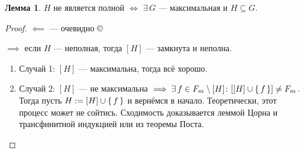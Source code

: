 \documentclass[12pt]{article}
\let\un\cup
\let\wot\setminus
\theoremstyle{definition}
\theoremstyle{statement}
\theoremstyle{theorem}
\newtheorem{lemma}{Лемма}[section]
\begin{document}
\begin{lemma}
  $H$ не является полной $\iff$ $\exists\, G$ --- максимальная и $H
  \subseteq G$.
  \begin{proof}
    $\impliedby$ --- очевидно \copyright

    $\implies$ если $H$ --- неполная, тогда $[H]$ --- замкнута и неполна.
    \begin{enumerate}
      \item Случай 1: $[H]$ --- максимальна, тогда всё хорошо.

      \item Случай 2: $[H]$ --- не максимальна $\implies \exists\, f
        \in F_m \wot [H] \colon [[H] \un \set{f}] \neq F_m$. Тогда
        пусть $H := [H] \un \set{f}$ и вернёмся в начало.
        Теоретически, этот процесс может не сойтись. Сходимость
        доказывается леммой Цорна и трансфинитной индукцией или из
        теоремы Поста.
    \end{enumerate}
  \end{proof}
\end{lemma}
\end{document}
